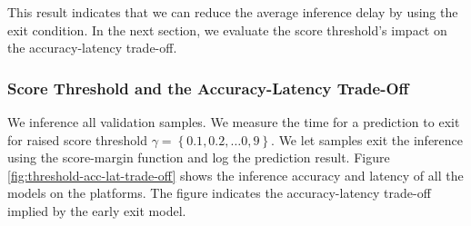 This result indicates that we can reduce the average inference delay by using the exit condition. In the next section, we evaluate the score threshold's impact on the accuracy-latency trade-off.
\subsubsection{Score Threshold and the Accuracy-Latency Trade-Off}
We inference all validation samples. We measure the time for a prediction to exit for raised score threshold $ \gamma = \left\{0.1, 0.2, \dots 0,9\right\} $. We let samples exit the inference using the score-margin function and log the prediction result. Figure \ref{fig:threshold-acc-lat-trade-off} shows the inference accuracy and latency of all the models on the platforms. The figure indicates the accuracy-latency trade-off implied by the early exit model.

